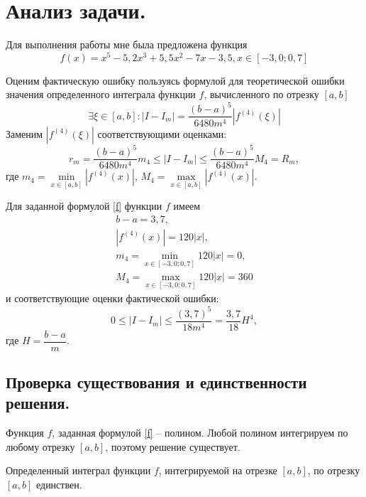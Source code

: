 \documentclass[a4paper, 12pt]{article}
\begin{document}
	\section{Анализ задачи.}
	
	Для выполнения работы мне была предложена функция
	\begin{equation} \label{f}
		f(x)=x^5-5,2x^3+5,5x^2-7x-3,5, x\in[-3,0;0,7]
	\end{equation}
	
	Оценим фактическую ошибку пользуясь формулой для теоретической ошибки значения определенного интеграла функции $f$, вычисленного по отрезку $[a,b]$
	\begin{equation}
		\exists\xi\in[a,b]:|I-I_m|=\frac{(b-a)^5}{6480m^4}|f^{(4)}(\xi)|
	\end{equation}
	Заменим $|f^{(4)}(\xi)|$ соответствующими оценками:
	\begin{equation} \label{theor_est}
		r_m=\frac{(b-a)^5}{6480m^4}m_4 \leq |I-I_m| \leq \frac{(b-a)^5}{6480m^4}M_4=R_m,
	\end{equation}
	где $m_4=\min\limits_{x\in[a,b]}|f^{(4)}(x)|$, $M_4=\max\limits_{x\in[a,b]}|f^{(4)}(x)|$.
	
	Для заданной формулой \eqref{f} функции $f$ имеем
	\begin{equation*} 
		\begin{gathered}
			b-a=3,7,\\
			|f^{(4)}(x)|=120|x|,\\
			m_4=\min\limits_{x\in[-3,0;0,7]}120|x|=0,\\
			M_4=\max\limits_{x\in[-3,0;0,7]}120|x|=360
		\end{gathered}
	\end{equation*}
	и соответствующие оценки фактической ошибки:
	\begin{equation} \label{final_est}
		0 \leq |I-I_m| \leq \frac{(3,7)^5}{18m^4}=\frac{3,7}{18}H^4,
	\end{equation}
	где $H=\dfrac{b-a}{m}$.
	
	\subsection{Проверка существования и единственности решения.}
	\label{solexistance}
	
	Функция $f$, заданная формулой \eqref{f} -- полином. Любой полином интегрируем по любому отрезку $[a,b]$, поэтому решение существует.
	
	Определенный интеграл функции $f$, интегрируемой на отрезке $[a,b]$, по отрезку $[a,b]$ единствен.
	
\end{document}
